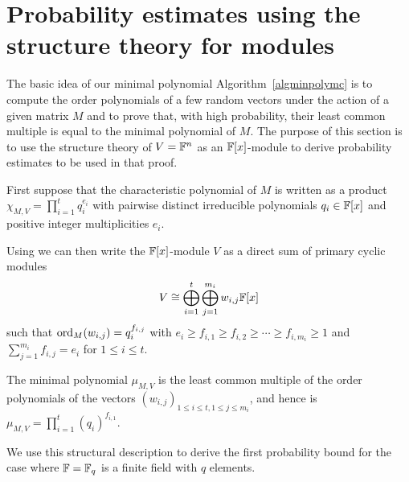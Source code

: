 \section{Probability estimates using the structure theory for modules}
\label{probest}

The basic idea of our minimal polynomial Algorithm~\ref{algminpolymc}
is to compute the order polynomials of a few
random vectors under the action of a given matrix $M$ and to prove that, 
with high probability, their least common multiple is
equal to the minimal polynomial of $M$.
The purpose of this section is to use the structure theory 
of $V = \mathbb{F}^n$ as an $\mathbb{F}[x]$-module to derive probability
estimates to be used in that proof.

First suppose that the characteristic polynomial of $M$ is written as a product
$\chi_{M,V} = \prod_{i=1}^t q_i^{e_i}$ with pairwise distinct
irreducible polynomials $q_i \in \mathbb{F}[x]$ and positive integer
multiplicities $e_i$.

Using \cite[Theorem 3.12]{Jacob1} we can then write the $\mathbb{F}[x]$-module $V$
as a direct sum of primary cyclic modules
\begin{equation} \label{primary}
V \cong \bigoplus_{i=1}^t \bigoplus_{j=1}^{m_i} w_{i,j} \F[x] 
\end{equation}
such that $\mathrm{ord}_M(w_{i,j}) = q_i^{f_{i,j}}$ with
$e_i \ge f_{i,1} \ge f_{i,2} \ge \cdots \ge f_{i,m_i} \ge 1$
and $\sum_{j=1}^{m_i} f_{i,j}=e_i$ for $1 \le i \le t$.

The minimal polynomial $\mu_{M,V}$ is the least
common multiple of the order polynomials of the vectors 
$(w_{i,j})_{1 \le i \le t, 1 \le j \le m_i}$, and hence is 
$\mu_{M,V} = \prod_{i=1}^t (q_i)^{f_{i,1}}$.

We use this structural description to derive the
first probability bound for the case where $\mathbb{F} = \mathbb{F}_q$ is a finite field
with $q$ elements.

